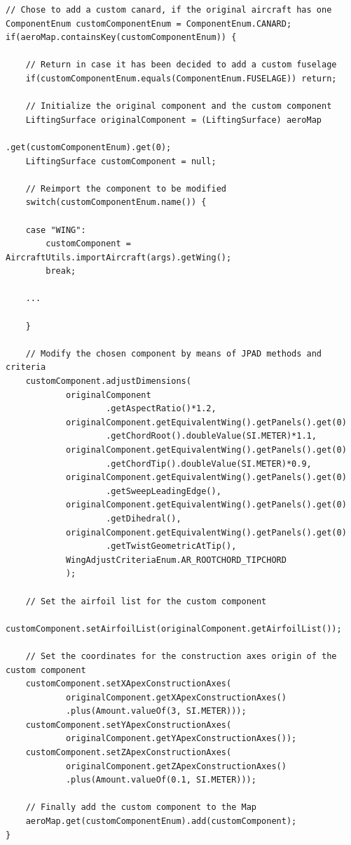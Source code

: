 \begin{lstlisting}[caption={Adding custom components to the original Map}, captionpos=b, tabsize=2, label={lst:AddCustomComponents}]
// Chose to add a custom canard, if the original aircraft has one
ComponentEnum customComponentEnum = ComponentEnum.CANARD;
if(aeroMap.containsKey(customComponentEnum)) {
		
	// Return in case it has been decided to add a custom fuselage	
	if(customComponentEnum.equals(ComponentEnum.FUSELAGE)) return;
	
	// Initialize the original component and the custom component		
	LiftingSurface originalComponent = (LiftingSurface) aeroMap
											.get(customComponentEnum).get(0);
	LiftingSurface customComponent = null;
	
	// Reimport the component to be modified		
	switch(customComponentEnum.name()) {
			
	case "WING": 
		customComponent = AircraftUtils.importAircraft(args).getWing();
		break;
						
	...

	}
	
	// Modify the chosen component by means of JPAD methods and criteria				
	customComponent.adjustDimensions(
			originalComponent
					.getAspectRatio()*1.2,
			originalComponent.getEquivalentWing().getPanels().get(0)
					.getChordRoot().doubleValue(SI.METER)*1.1,
			originalComponent.getEquivalentWing().getPanels().get(0)
					.getChordTip().doubleValue(SI.METER)*0.9, 
			originalComponent.getEquivalentWing().getPanels().get(0)
					.getSweepLeadingEdge(),
			originalComponent.getEquivalentWing().getPanels().get(0)
					.getDihedral(), 
			originalComponent.getEquivalentWing().getPanels().get(0)
					.getTwistGeometricAtTip(), 
			WingAdjustCriteriaEnum.AR_ROOTCHORD_TIPCHORD
			);
	
	// Set the airfoil list for the custom component		
	customComponent.setAirfoilList(originalComponent.getAirfoilList());	
	
	// Set the coordinates for the construction axes origin of the custom component
	customComponent.setXApexConstructionAxes(
			originalComponent.getXApexConstructionAxes()
			.plus(Amount.valueOf(3, SI.METER)));
	customComponent.setYApexConstructionAxes(
			originalComponent.getYApexConstructionAxes());
	customComponent.setZApexConstructionAxes(
			originalComponent.getZApexConstructionAxes()
			.plus(Amount.valueOf(0.1, SI.METER)));
	
	// Finally add the custom component to the Map
	aeroMap.get(customComponentEnum).add(customComponent);
}
\end{lstlisting}
%

